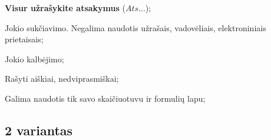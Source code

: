 \documentclass[a4paper]{article}
\begin{document}
\begin{small}
      \begin{enumerate*}[label={(\arabic*)}]
            \item \textbf{Visur užrašykite atsakymus} ($Ats\ldots$);
            \item Jokio sukčiavimo. Negalima naudotis užrašais, vadovėliais,
            elektroniniais prietaisais;
            \item Jokio kalbėjimo;
            \item Rašyti aiškiai, nedviprasmiškai;
            \item Galima naudotis tik savo skaičiuotuvu ir formulių lapu;
      \end{enumerate*}
\end{small}

\vspace{10 em}


\subsection*{2 variantas}
\end{document}
